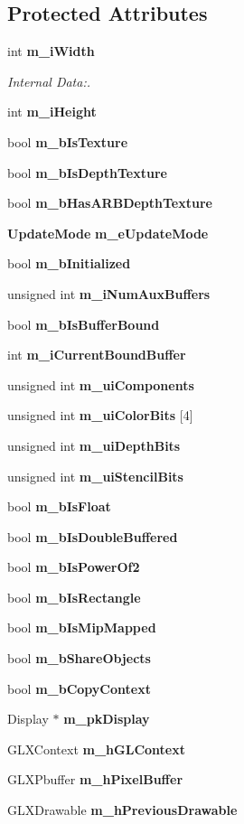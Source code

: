 \subsection*{Protected Attributes}
\begin{CompactItemize}
\item 
int {\bf m\_\-i\-Width}
\begin{CompactList}\small\item\em Internal Data:. \item\end{CompactList}\item 
int {\bf m\_\-i\-Height}
\item 
bool {\bf m\_\-b\-Is\-Texture}
\item 
bool {\bf m\_\-b\-Is\-Depth\-Texture}
\item 
bool {\bf m\_\-b\-Has\-ARBDepth\-Texture}
\item 
{\bf Update\-Mode} {\bf m\_\-e\-Update\-Mode}
\item 
bool {\bf m\_\-b\-Initialized}
\item 
unsigned int {\bf m\_\-i\-Num\-Aux\-Buffers}
\item 
bool {\bf m\_\-b\-Is\-Buffer\-Bound}
\item 
int {\bf m\_\-i\-Current\-Bound\-Buffer}
\item 
unsigned int {\bf m\_\-ui\-Components}
\item 
unsigned int {\bf m\_\-ui\-Color\-Bits} [4]
\item 
unsigned int {\bf m\_\-ui\-Depth\-Bits}
\item 
unsigned int {\bf m\_\-ui\-Stencil\-Bits}
\item 
bool {\bf m\_\-b\-Is\-Float}
\item 
bool {\bf m\_\-b\-Is\-Double\-Buffered}
\item 
bool {\bf m\_\-b\-Is\-Power\-Of2}
\item 
bool {\bf m\_\-b\-Is\-Rectangle}
\item 
bool {\bf m\_\-b\-Is\-Mip\-Mapped}
\item 
bool {\bf m\_\-b\-Share\-Objects}
\item 
bool {\bf m\_\-b\-Copy\-Context}
\item 
Display $\ast$ {\bf m\_\-pk\-Display}
\item 
GLXContext {\bf m\_\-h\-GLContext}
\item 
GLXPbuffer {\bf m\_\-h\-Pixel\-Buffer}
\item 
GLXDrawable {\bf m\_\-h\-Previous\-Drawable}
\item 

\end{CompactItemize}
